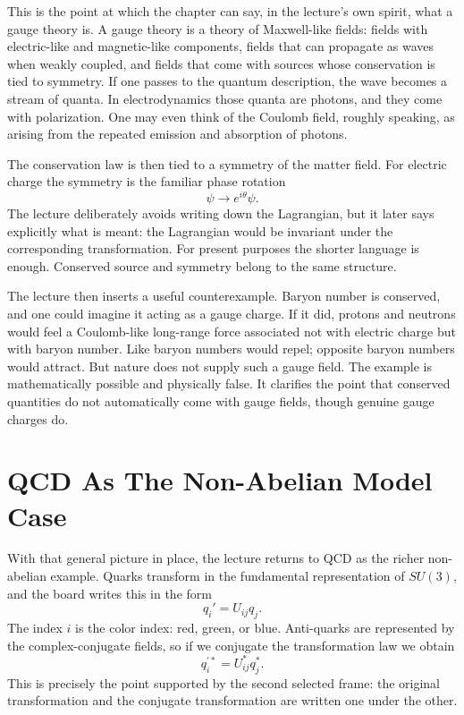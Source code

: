 This is the point at which the chapter can say, in the lecture's own spirit, what a gauge theory is. A gauge theory is a theory of Maxwell-like fields: fields with electric-like and magnetic-like components, fields that can propagate as waves when weakly coupled, and fields that come with sources whose conservation is tied to symmetry. If one passes to the quantum description, the wave becomes a stream of quanta. In electrodynamics those quanta are photons, and they come with polarization. One may even think of the Coulomb field, roughly speaking, as arising from the repeated emission and absorption of photons.

The conservation law is then tied to a symmetry of the matter field. For electric charge the symmetry is the familiar phase rotation
\begin{equation}
\psi \to e^{i\theta}\psi.
\end{equation}
The lecture deliberately avoids writing down the Lagrangian, but it later says explicitly what is meant: the Lagrangian would be invariant under the corresponding transformation. For present purposes the shorter language is enough. Conserved source and symmetry belong to the same structure.

The lecture then inserts a useful counterexample. Baryon number is conserved, and one could imagine it acting as a gauge charge. If it did, protons and neutrons would feel a Coulomb-like long-range force associated not with electric charge but with baryon number. Like baryon numbers would repel; opposite baryon numbers would attract. But nature does not supply such a gauge field. The example is mathematically possible and physically false. It clarifies the point that conserved quantities do not automatically come with gauge fields, though genuine gauge charges do.

\section{QCD As The Non-Abelian Model Case}

With that general picture in place, the lecture returns to QCD as the richer non-abelian example. Quarks transform in the fundamental representation of \(SU(3)\), and the board writes this in the form
\begin{equation}
q_i'=U_{ij}q_j.
\end{equation}
The index \(i\) is the color index: red, green, or blue. Anti-quarks are represented by the complex-conjugate fields, so if we conjugate the transformation law we obtain
\begin{equation}
q_i^{\prime *}=U_{ij}^*q_j^*.
\end{equation}
This is precisely the point supported by the second selected frame: the original transformation and the conjugate transformation are written one under the other.

